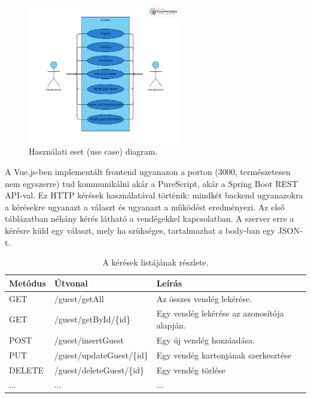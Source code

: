 \documentclass[12pt]{article}
\begin{document}
\begin{figure}[h!]
\centering
\includegraphics[width=0.6\textwidth]{usecase}
\caption{Használati eset (use case) diagram. }
\end{figure}


A Vue.js-ben implementált frontend ugyanazon a porton (3000, természetesen nem egyszerre) tud kommunikálni akár a PureScript,  akár a Spring Boot REST API-val. Ez HTTP kérések használatával történik: mindkét backend ugyanazokra a kérésekre ugyanazt a választ és ugyanazt a működést eredményezi.  Az első táblázatban néhány kérés látható a vendégekkel kapcsolatban. A szerver erre a kérésre küld egy választ, mely ha szükséges, tartalmazhat a body-ban egy JSON-t.

\begin{table}[h!]
\centering
\begin{tabular}{ |p{1.7cm}|p{4.4cm}|p{6.3cm}| } 
\hline
 \textbf{Metódus} & \textbf{Útvonal} &\textbf{Leírás}\\
\hline
GET & /guest/getAll& Az összes vendég lekérése.\\
\hline
GET & /guest/getById/\{id\}& Egy vendég lekérése az azonosítója alapján.\\
\hline
POST & /guest/insertGuest&  Egy új vendég hozzáadása. \\
\hline
PUT & /guest/updateGuest/\{id\} & Egy vendég kartonjának szerkesztése \\
\hline
DELETE & /guest/deleteGuest/\{id\} & Egy vendég törlése  \\
\hline
... & ... &...  \\
\hline
\end{tabular}
\caption{A kérések listájának részlete.}
\end{table}
\end{document}

